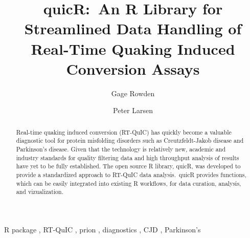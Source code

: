 \documentclass[preprint,12pt, a4paper]{elsarticle}
\begin{document}
\renewcommand{\labelenumii}{\arabic{enumi}.\arabic{enumii}}

\begin{frontmatter}

 


\title{quicR:\ An R Library for Streamlined Data Handling of Real-Time Quaking Induced Conversion Assays}

\author[label1,label2,label3]{Gage Rowden}
\author[label1,label2,label3]{Peter Larsen}
\address[label1]{Department of Veterinary and Biomedical Sciences, University of Minnesota, USA.}
\address[label2]{Minnesota Center for Prion Research and Outreach, University of Minnesota, USA.}
\address[label3]{Priogen Corp., USA.}

\begin{abstract}
Real-time quaking induced conversion (RT-QuIC) has quickly become a valuable diagnostic tool for protein misfolding disorders such as Creutzfeldt-Jakob disease and Parkinson's disease. Given that the technology is relatively new, academic and industry standards for quality filtering data and high throughput analysis of results have yet to be fully established. The open source R library, quicR, was developed to provide a standardized approach to RT-QuIC data analysis.\ quicR provides functions, which can be easily integrated into existing R workflows, for data curation, analysis, and vizualization.
\end{abstract}

\begin{keyword}
R package \sep{} RT-QuIC \sep{} prion \sep{} diagnostics \sep{} CJD \sep{} Parkinson's



\end{keyword}

\end{frontmatter}
\end{document}
